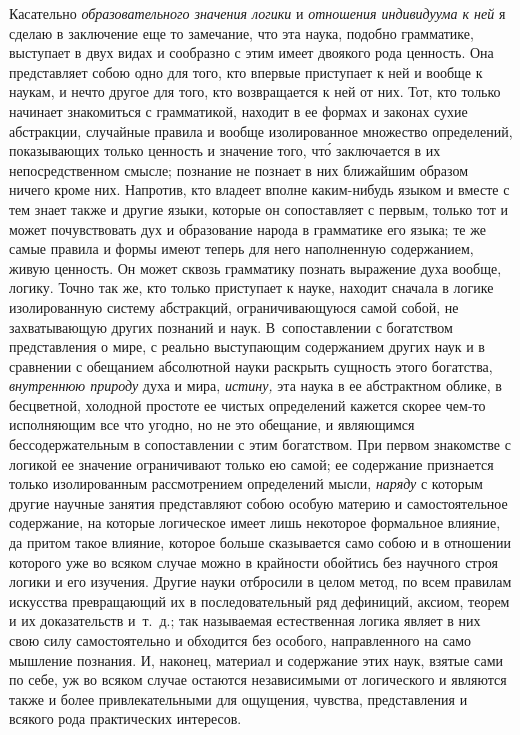 Касательно {\em образовательного значения логики} и
{\em отношения индивидуума к ней} я сделаю в заключение
еще то замечание, что эта наука, подобно грамматике, выступает в двух видах
и сообразно с этим имеет двоякого рода ценность. Она представляет собою
одно для того, кто впервые приступает к ней и вообще к наукам, и нечто
другое для того, кто возвращается к ней от них. Тот, кто только начинает
знакомиться с грамматикой, находит в ее формах и законах сухие абстракции,
случайные правила и вообще изолированное множество определений,
показывающих только ценность и значение того, чт\'{о} заключается в их
непосредственном смысле; познание не познает в них ближайшим образом ничего
кроме них. Напротив, кто владеет вполне каким-нибудь языком и вместе с тем
знает также и другие языки, которые он сопоставляет с первым, только тот и
может почувствовать дух и образование народа в грамматике его языка; те же
самые правила и формы имеют теперь для него наполненную содержанием, живую
ценность. Он может сквозь грамматику познать выражение духа вообще, логику.
Точно так же, кто только приступает к науке, находит сначала в логике
изолированную систему абстракций, ограничивающуюся самой собой, не
захватывающую других познаний и наук. В~сопоставлении с богатством
представления о мире, с реально выступающим содержанием других наук и в
сравнении с обещанием абсолютной науки раскрыть сущность этого богатства,
{\em внутреннюю природу} духа и мира,
{\em истину,} эта наука в ее абстрактном облике, в
бесцветной, холодной простоте ее чистых определений кажется скорее чем-то
исполняющим все что угодно, но не это обещание, и являющимся
бессодержательным в сопоставлении с этим богатством. При первом знакомстве
с логикой ее значение ограничивают только ею самой; ее содержание
признается только изолированным рассмотрением определений мысли,
{\em наряду} с которым другие научные занятия
представляют собою особую материю и самостоятельное содержание, на которые
логическое имеет лишь некоторое формальное влияние, да притом такое
влияние, которое больше сказывается само собою и в отношении которого уже
во всяком случае можно в крайности обойтись без научного строя логики и его
изучения. Другие науки отбросили в целом метод, по всем правилам искусства
превращающий их в последовательный ряд дефиниций, аксиом, теорем и их
доказательств и~т.~д.; так называемая естественная логика являет в них свою
силу самостоятельно и обходится без особого, направленного на само мышление
познания. И, наконец, материал и содержание этих наук, взятые сами по себе,
уж во всяком случае остаются независимыми от логического и являются также и
более привлекательными для ощущения, чувства, представления и всякого рода
практических интересов.

